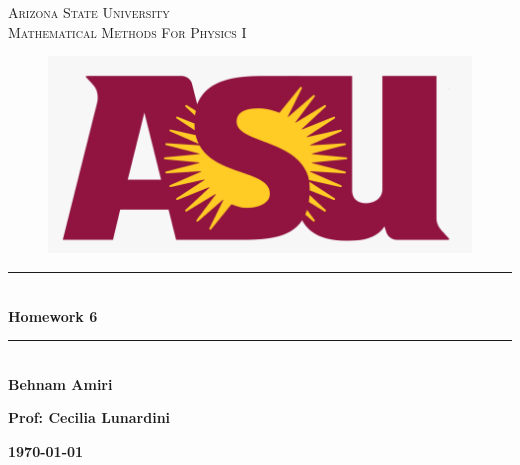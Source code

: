 \documentclass[fleqn]{article}
\begin{document}
  \begin{titlepage}

    \newcommand{\HRule}{\rule{\linewidth}{0.5mm}} 

    \center
    
    \textsc{\LARGE Arizona State University}\\[1.5cm] %

    \textsc{\LARGE Mathematical Methods For Physics I }\\[1.5cm] %


    \begin{figure}
      \includegraphics[width=\linewidth]{asu.png}
    \end{figure}


    \HRule \\[0.4cm]
    { \huge \bfseries Homework 6}\\[0.4cm] 
    \HRule \\[1.5cm]
    
    \textbf{Behnam Amiri}

    \bigbreak

    \textbf{Prof: Cecilia Lunardini}

    \bigbreak


    \textbf{{\large \today}\\[2cm]}

    \vfill %

  \end{titlepage}
\end{document}
